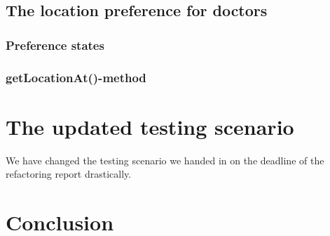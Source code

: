 \documentclass[12pt]{article}
\begin{document}
\subsection{The location preference for doctors}
\subsubsection{Preference states}
\subsubsection{getLocationAt()-method}

\section{The updated testing scenario}
We have changed the testing scenario we handed in on the deadline of the refactoring report drastically.
\section{Conclusion}
\end{document}
